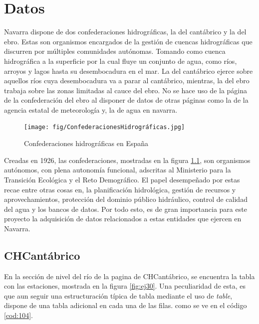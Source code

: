\chapter[Datos]{Datos}
\label{Chap2}

Navarra dispone de dos confederaciones hidrográficas, la del cantábrico y la del ebro. Estas son organismos encargados de la gestión de cuencas hidrográficas que discurren por múltiples comunidades autónomas. Tomando como cuenca hidrográfica a la superficie por la cual fluye un conjunto de agua, como ríos, arroyos y lagos hasta su desembocadura en el mar.\newline
\newline
La del cantábrico ejerce sobre aquellos ríos cuya desembocadura va a parar al cantábrico, mientras, la del ebro trabaja sobre las zonas limitadas al cauce del ebro.\newline
\newline
No se hace uso de la página de la confederación del ebro al disponer de datos de otras páginas como la de la agencia estatal de meteorología y, la de agua en navarra. 

\begin{figure} [H]
	\centering
	\texttt{[image: fig/ConfederacionesHidrográficas.jpg]}
	\caption[Confederaciones hidrográficas en España]{Confederaciones hidrográficas en España}
	\label{fig:ej32}
\end{figure}

Creadas en 1926, las confederaciones, mostradas en la figura \ref{fig:ej32}, son organismos autónomos, con plena autonomía funcional, adscritas al Ministerio para la Transición Ecológica y el Reto Demográfico. El papel desempeñado por estas recae entre otras cosas en, la planificación hidrológica, gestión de recursos y aprovechamientos, protección del dominio público hidráulico, control de calidad del agua y los bancos de datos.\newline
\newline
Por todo esto, es de gran importancia para este proyecto la adquisición de datos relacionados a estas entidades que ejercen en Navarra.

\section{CHCantábrico}
En la sección de nivel del río de la pagina de CHCantábrico, se encuentra la tabla con las estaciones, mostrada en la figura \ref{fig:ej30}. Una peculiaridad de esta, es que aun seguir una estructuración típica de tabla mediante el uso de \textit{table}, dispone de una tabla adicional en cada una de las filas. como se ve en el código \ref{cod:104}.

